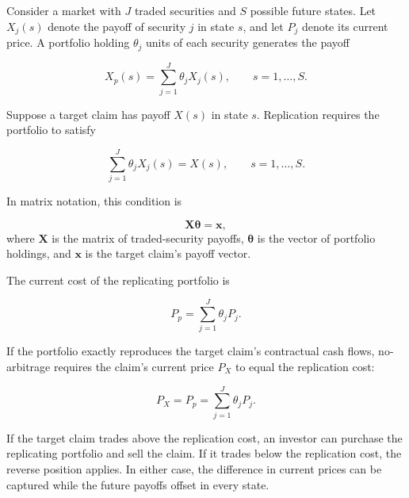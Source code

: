 Consider a market with $J$ traded securities and
$S$ possible future states. Let $X_j(s)$ denote the
payoff of security $j$ in state $s$, and let $P_j$
denote its current price. A portfolio holding
$\theta_j$ units of each security generates the
payoff

\begin{equation}
X_p(s)
=
\sum_{j=1}^{J}\theta_j X_j(s),
\qquad s=1,\ldots,S.
\label{eq:ch11-replicating-portfolio-payoff}
\end{equation}

Suppose a target claim has payoff $X(s)$ in state
$s$. Replication requires the portfolio to satisfy

\begin{equation}
\sum_{j=1}^{J}\theta_j X_j(s)
=
X(s),
\qquad s=1,\ldots,S.
\label{eq:ch11-replication-conditions}
\end{equation}

In matrix notation, this condition is

\begin{equation}
\mathbf{X}\boldsymbol{\theta}
=
\mathbf{x},
\label{eq:ch11-replication-matrix}
\end{equation}
where $\mathbf{X}$ is the matrix of traded-security
payoffs, $\boldsymbol{\theta}$ is the vector of
portfolio holdings, and $\mathbf{x}$ is the target
claim's payoff vector.

The current cost of the replicating portfolio is

\begin{equation}
P_p
=
\sum_{j=1}^{J}\theta_j P_j.
\label{eq:ch11-replicating-portfolio-cost}
\end{equation}

If the portfolio exactly reproduces the target
claim's contractual cash flows, no-arbitrage
requires the claim's current price $P_X$ to equal the
replication cost:

\begin{equation}
P_X=P_p
=
\sum_{j=1}^{J}\theta_j P_j.
\label{eq:ch11-replication-pricing}
\end{equation}

If the target claim trades above the replication
cost, an investor can purchase the replicating
portfolio and sell the claim. If it trades below
the replication cost, the reverse position applies.
In either case, the difference in current prices
can be captured while the future payoffs offset
in every state.

